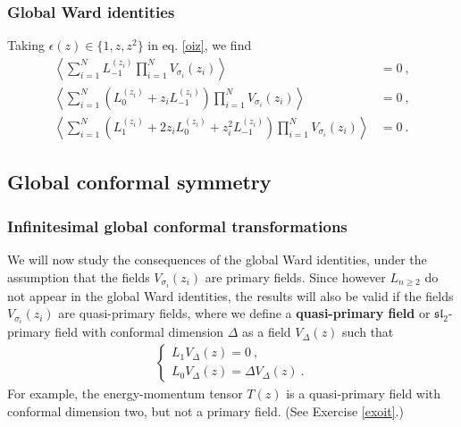 \documentclass[12pt, a4paper, notitlepage, twoside]{report}
\numberwithin{equation}{section}
\theoremstyle{break}
\begin{document}
\subsubsection{Global Ward identities}

Taking $\epsilon(z)\in \{1,z,z^2\}$ in eq. \eqref{oiz}, we find 
\begin{align}
\left\langle \sum_{i=1}^N L_{-1}^{(z_i)} \prod_{i=1}^N V_{\sigma_i}(z_i) \right\rangle &= 0 \ ,
\label{slz}
\\
\left\langle \sum_{i=1}^N \left( L_0^{(z_i)} + z_i L_{-1}^{(z_i)}\right) \prod_{i=1}^N V_{\sigma_i}(z_i) \right\rangle & = 0 \ ,
\label{sllz}
\\
\left\langle \sum_{i=1}^N \left( L_1^{(z_i)} + 2z_i L_0^{(z_i)} + z_i^2 L_{-1}^{(z_i)}\right) \prod_{i=1}^N V_{\sigma_i}(z_i) \right\rangle & = 0\ .
\label{slllz}
\end{align}

\subsection{Global conformal symmetry}\label{secgcs}

\subsubsection{Infinitesimal global conformal transformations}

We will now study the consequences of the global Ward identities, under the assumption that the fields $V_{\sigma_i}(z_i)$ are primary fields. Since however $L_{n\geq 2}$ do not appear in the global Ward identities, the results will also be valid if the fields $V_{\sigma_i}(z_i)$ are quasi-primary fields, where we define a \textbf{\boldmath quasi-primary field} or $\mathfrak{sl}_2$-primary field with conformal dimension $\Delta$ as a field $V_\Delta(z)$ such that 
\begin{align}
 \left\{\begin{array}{l}  L_1 V_\Delta(z) = 0 \ , 
\\
L_0 V_\Delta(z) = \Delta V_\Delta(z) \ .
\end{array}\right. 
\label{lolz}
\end{align}
For example, the energy-momentum tensor $T(z)$ is a quasi-primary field with conformal dimension two, but not a primary field. (See Exercise \eqref{exoit}.) 
\end{document}
